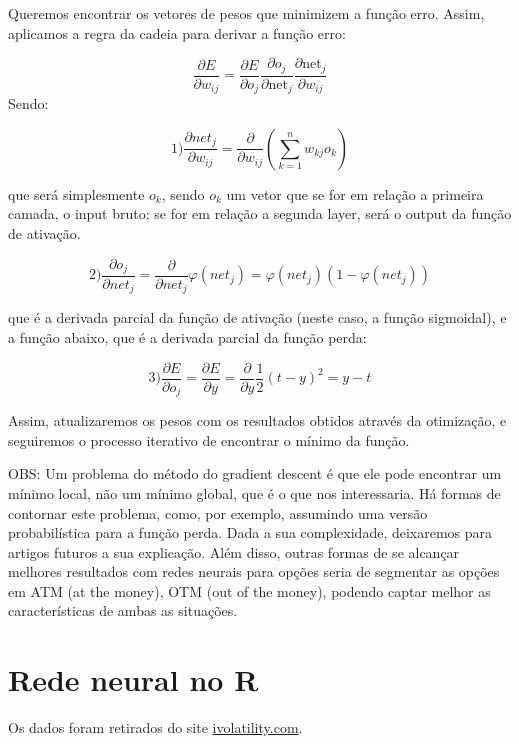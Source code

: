 \documentclass[]{book}
\theoremstyle{definition}
\theoremstyle{definition}
\theoremstyle{definition}
\theoremstyle{remark}
\begin{document}
Queremos encontrar os vetores de pesos que minimizem a função erro. Assim, aplicamos a regra da cadeia para derivar a função erro:

\[
{\frac {\partial E}{\partial w_{ij}}}={\frac {\partial E}{\partial o_{j}}}{\frac {\partial o_{j}}{\partial {\text{net}}_{j}}}{\frac {\partial {\text{net}}_{j}}{\partial w_{ij}}}
\]
Sendo:

\[
1)
{\frac{\partial net_j}{\partial w_{ij}}}={\frac {\partial }{\partial w_{ij}}}\left(\sum _{k=1}^{n}w_{kj}o_{k}\right)
\]

que será simplesmente \(o_k\), sendo \(o_k\) um vetor que se for em relação a primeira camada, o input bruto; se for em relação a segunda layer, será o output da função de ativação.

\[
2)
{\frac{\partial o_j}{\partial net_{j}}}={\frac {\partial }{\partial net_{j}}} \varphi(net_j) = \varphi(net_j)(1 - \varphi(net_j))
\]

que é a derivada parcial da função de ativação (neste caso, a função sigmoidal), e a função abaixo, que é a derivada parcial da função perda:

\[
3)
{\frac{\partial E}{\partial o_{j}}}={\frac {\partial E }{\partial y}} = {\frac {\partial}{\partial y}} {\frac {1}{2}}(t - y)^2 = y - t
\]

Assim, atualizaremos os pesos com os resultados obtidos através da otimização, e seguiremos o processo iterativo de encontrar o mínimo da função.

OBS: Um problema do método do gradient descent é que ele pode encontrar um mínimo local, não um mínimo global, que é o que nos interessaria. Há formas de contornar este problema, como, por exemplo, assumindo uma versão probabilística para a função perda. Dada a sua complexidade, deixaremos para artigos futuros a sua explicação. Além disso, outras formas de se alcançar melhores resultados com redes neurais para opções seria de segmentar as opções em ATM (at the money), OTM (out of the money), podendo captar melhor as características de ambas as situações.

\hypertarget{rede-neural-no-r}{%
\section{Rede neural no R}\label{rede-neural-no-r}}

Os dados foram retirados do site \href{http://www.ivolatility.com/doc/usa/IV_Raw_Delta_surface.csv}{ivolatility.com}.
\end{document}

